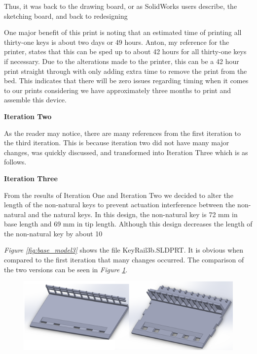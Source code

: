Thus, it was back to the drawing board, or as SolidWorks users describe, the sketching board, and back to redesigning

One major benefit of this print is noting that an estimated time of printing all thirty-one keys is about two days or 49 hours. Anton, my reference for the printer, states that this can be sped up to about 42 hours for all thirty-one keys if necessary. Due to the alterations made to the printer, this can be a 42 hour print straight through with only adding extra time to remove the print from the bed. This indicates that there will be zero issues regarding timing when it comes to our prints considering we have approximately three months to print and assemble this device.

\textbf{Iteration Two}

As the reader may notice, there are many references from the first iteration to the third iteration. This is because iteration two did not have many major changes, was quickly discussed, and transformed into Iteration Three which is as follows.

\textbf{Iteration Three}

From the results of Iteration One and Iteration Two we decided to alter the length of the non-natural keys to prevent actuation interference between the non-natural and the natural keys. In this design, the non-natural key is 72 mm in base length and 69 mm in tip length. Although this design decreases the length of the non-natural key by about 10%

\textit{Figure \ref{fig:base_model3}} shows the file KeyRail3b.SLDPRT. It is obvious when compared to the first iteration that many changes occurred. The comparison of the two versions can be seen in \textit{Figure \ref{fig:base_model2}}.

\begin{figure}[h!]
  \centering
  \includegraphics[width=0.8\linewidth]{image/BaseModel2.png}
  \caption{}
  \label{fig:base_model2}
\end{figure}

